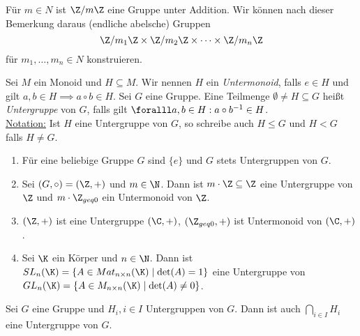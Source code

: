 \begin{exmp*}
	Für $ m \in N $ ist $ \Z / m\Z $ eine Gruppe unter Addition. Wir können nach dieser Bemerkung daraus (endliche abelsche) Gruppen
	\[ \Z/m_1\Z \times \Z/m_2\Z \times \dots \times \Z/m_n\Z \]
	für $ m_1, \dotsc, m_n \in N $ konstruieren.
\end{exmp*}

\begin{defn*}  
	Sei $M$ ein Monoid und $ H \subseteq M $. Wir nennen $H$ ein \emph{Untermonoid}, falls $ e \in H $ und gilt $ a,b \in H \implies a \circ b \in H $. Sei $G$ eine Gruppe. Eine Teilmenge $ \emptyset \neq H \subseteq G $ heißt \emph{Untergruppe} von $G$, falls gilt $ \foralll a,b \in H: a \circ b^{-1} \in H $.\\
	\underline{Notation:} Ist $H$ eine Untergruppe von $G$, so schreibe auch $H \leq G$ und $H < G$ falls $ H \neq G $.
\end{defn*}

\begin{exmp*}
	\begin{enumerate}[label=\textcircled{\alph*}]
		\item Für eine beliebige Gruppe $G$ sind $\{e\}$ und $G$ stets Untergruppen von $G$.
		\item Sei $ (G,\circ) = (\Z,+) $ und $m \in \N$. Dann ist $ m \cdot \Z \subseteq \Z $ eine Untergruppe von $\Z$ und $ m \cdot \Z_{geq 0} $ ein Untermonoid von $\Z$.
		\item $ (\Z,+) $ ist eine Untergruppe $ (\C,+) $, $(\Z_{geq 0},+)$ ist Untermonoid von $(\C,+)$.
		\item Sei $\K$ ein Körper und $n \in \N$. Dann ist $ SL_n(\K) = \{A \in Mat_{n \times n}(\K) \mid \det(A) = 1\} $ eine Untergruppe von $ GL_n(\K) = \{A \in M_{n \times n}(\K) \mid \det(A) \neq 0\} $.
	\end{enumerate}
\end{exmp*}

\begin{rem*}
	Sei $G$ eine Gruppe und $ H_i, i \in I $ Untergruppen von $G$. Dann ist auch $ \bigcap_{i \in I} H_i $ eine Untergruppe von $G$.
\end{rem*}